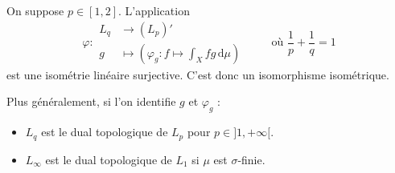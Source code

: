 
	\begin{theorem}
		On suppose $p \in [1, 2]$. L'application
		\[
		\varphi :
		\begin{array}{ll}
			L_q &\rightarrow (L_p)' \\
			g &\mapsto \left( \varphi_g : f \mapsto \int_X f g \, \mathrm{d}\mu \right)
		\end{array}
		\qquad \text{ où } \frac{1}{p} + \frac{1}{q} = 1
		\]
		est une isométrie linéaire surjective. C'est donc un isomorphisme isométrique.
	\end{theorem}


	\begin{remark}
		Plus généralement, si l'on identifie $g$ et $\varphi_g$ :
		\begin{itemize}
			\item $L_q$ est le dual topologique de $L_p$ pour $p \in ]1, +\infty[$.
			\item $L_\infty$ est le dual topologique de $L_1$ si $\mu$ est $\sigma$-finie.
		\end{itemize}
	\end{remark}

